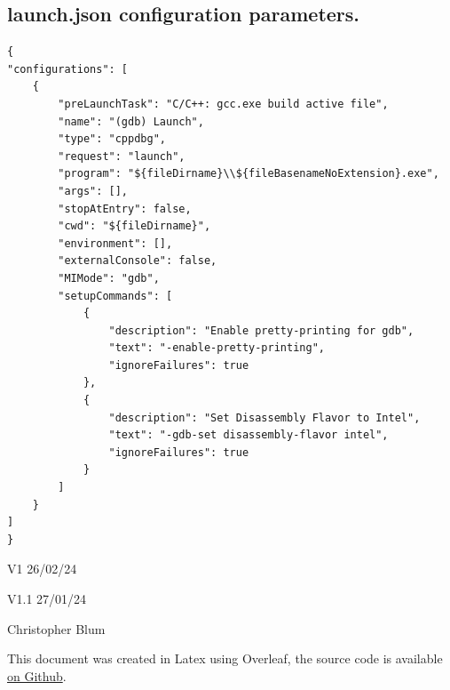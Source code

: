 \documentclass{article}
\begin{document}
\subsection{launch.json configuration parameters.}
\begin{verbatim}
{
"configurations": [
    {   
        "preLaunchTask": "C/C++: gcc.exe build active file",
        "name": "(gdb) Launch",
        "type": "cppdbg",
        "request": "launch",
        "program": "${fileDirname}\\${fileBasenameNoExtension}.exe",
        "args": [],
        "stopAtEntry": false,
        "cwd": "${fileDirname}",
        "environment": [],
        "externalConsole": false,
        "MIMode": "gdb",
        "setupCommands": [
            {
                "description": "Enable pretty-printing for gdb",
                "text": "-enable-pretty-printing",
                "ignoreFailures": true
            },
            {
                "description": "Set Disassembly Flavor to Intel",
                "text": "-gdb-set disassembly-flavor intel",
                "ignoreFailures": true
            }
        ]
    }
]
}
\end{verbatim}

\par
V1 26/02/24\par
V1.1 27/01/24\par
Christopher Blum\par
This document was created in Latex using Overleaf, the source code is available \href{https://github.com/PrimaryComet/CSA-VSCode-Setup-Guide}{on Github}.
\end{document}
